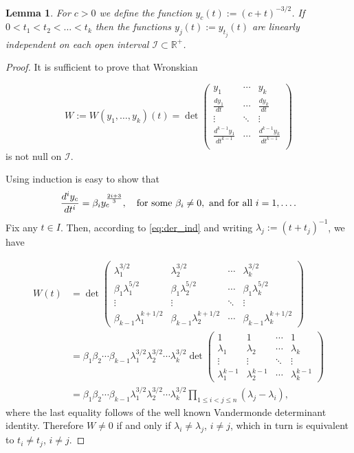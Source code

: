 \documentclass[twoside]{article}
\newtheorem{lem}[thm]{Lemma}
\theoremstyle{remark}
\begin{document}
\begin{lem}\label{lem:1} For $c>0$ we define the function $y_c(t):=(c+t)^{-3/2}$. If $0<t_1<t_2<\ldots<t_k$ then the functions $y_j(t):=y_{t_j}(t)$  are linearly independent on  each open interval   $\mathcal{I}\subset \mathbb{R}^+$.
\end{lem}
\begin{proof} It is sufficient to prove that Wronskian

 \[W:=W(y_1,\ldots,y_k)(t)=\det\begin{pmatrix}
			      y_1 & \cdots & y_k\\
			      \frac{dy_1}{dt}&  \cdots & \frac{dy_k}{dt}\\
			      \vdots & \ddots & \vdots \\
			      \frac{d^{k-1}y_1}{dt^{k-1}}&  \cdots & \frac{d^{k-1}y_k}{dt^{k-1}}\\
                           \end{pmatrix}
\]
is not null on $\mathcal{I}$.

Using induction is easy to show that
\begin{equation}\label{eq:der_ind}\frac{d^iy_c}{dt^i}=\beta_{i}y_{c}^{\frac{2i+3}{3}},\quad\hbox{for some }\beta_{i}\neq 0, \hbox{ and for all }i=1,\ldots.
\end{equation}
Fix any $t\in I$. Then, according to \eqref{eq:der_ind} and writing $\lambda_j:=(t+t_j)^{-1}$, we have

\[
\begin{split}
  W(t)&=\det
    \begin{pmatrix}
      \lambda_1^{3/2} & \lambda_2^{3/2} &\cdots & \lambda_k^{3/2} \\
      \beta_1\lambda_1^{5/2} &\beta_1 \lambda_2^{5/2} &\cdots &\beta_1 \lambda_k^{5/2}\\
      \vdots & \vdots &\ddots & \vdots\\
      \beta_{k-1}\lambda_1^{k+1/2} & \beta_{k-1}\lambda_2^{k+1/2} &\cdots & \beta_{k-1}\lambda_k^{k+1/2}
    \end{pmatrix}
  \\
  &= \beta_1\beta_2\cdots\beta_{k-1} \lambda_1^{3/2}\lambda_2^{3/2}\cdots \lambda_k^{3/2}
     \det \begin{pmatrix}
      1& 1 &\cdots & 1 \\
      \lambda_1 & \lambda_2 &\cdots & \lambda_k\\
      \vdots & \vdots &\ddots & \vdots\\
      \lambda_1^{k-1} & \lambda_2^{k-1} &\cdots & \lambda_k^{k-1}
    \end{pmatrix}
  \\
  &= \beta_1\beta_2\cdots\beta_{k-1} \lambda_1^{3/2}\lambda_2^{3/2}\cdots \lambda_k^{3/2}
  \prod_{1\leq i<j\leq n}(\lambda_j-\lambda_i)
,
\end{split}
\]
where the last equality follows of the well known Vandermonde determinant identity. Therefore $W\neq 0$ if and only if $\lambda_i\neq\lambda_j$, $i\neq j$,
which in turn is equivalent to $t_i\neq t_j$, $i\neq j$.
\end{proof}
\end{document}
